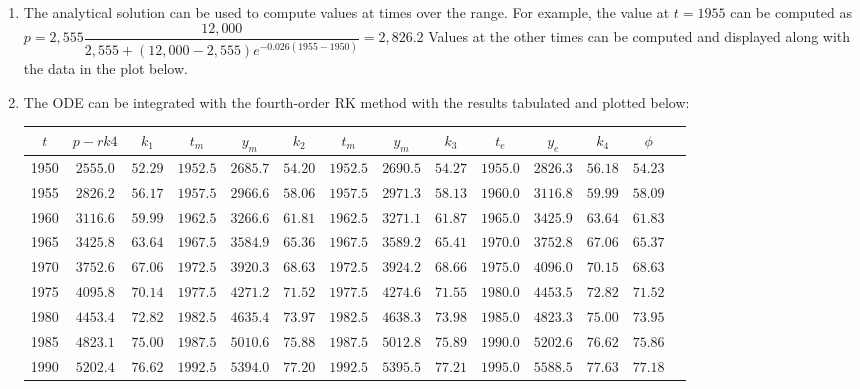 \documentclass[../main.tex]{subfiles}
\begin{document}
\section{} \label{sec:sec_18_5}
\begin{enumerate}[label=\bfseries(\alph*)]
\item  The analytical solution can be used to compute values at times over the range. For example, the value at $t=1955$ can be computed as
	\bigbreak
$p=2,555 \dfrac{12,000}{2,555+(12,000-2,555) e^{-0.026(1955-1950)}}=2,826.2$
	\bigbreak
Values at the other times can be computed and displayed along with the data in the plot below.
	\bigbreak
\item The ODE can be integrated with the fourth-order RK method with the results tabulated and plotted below:
	\bigbreak
\begin{tabular}{cccccccccccccc}
\hline
$t$ & $p-r k 4$ & $k_{1}$ & $t_{m}$ & $y_{m}$ & $k_{2}$ & $t_{m}$ & $y_{m}$ & $k_{3}$ & $t_{e}$ & $y_{e}$ & $k_{4}$ & $\phi$ \\
\hline
1950 & $2555.0$ & $52.29$ & $1952.5$ & $2685.7$ & $54.20$ & $1952.5$ & $2690.5$ & $54.27$ & $1955.0$ & $2826.3$ & $56.18$ & $54.23$ \\
1955 & $2826.2$ & $56.17$ & $1957.5$ & $2966.6$ & $58.06$ & $1957.5$ & $2971.3$ & $58.13$ & $1960.0$ & $3116.8$ & $59.99$ & $58.09$ \\
1960 & $3116.6$ & $59.99$ & $1962.5$ & $3266.6$ & $61.81$ & $1962.5$ & $3271.1$ & $61.87$ & $1965.0$ & $3425.9$ & $63.64$ & $61.83$ \\
1965 & $3425.8$ & $63.64$ & $1967.5$ & $3584.9$ & $65.36$ & $1967.5$ & $3589.2$ & $65.41$ & $1970.0$ & $3752.8$ & $67.06$ & $65.37$ \\
1970 & $3752.6$ & $67.06$ & $1972.5$ & $3920.3$ & $68.63$ & $1972.5$ & $3924.2$ & $68.66$ & $1975.0$ & $4096.0$ & $70.15$ & $68.63$ \\
1975 & $4095.8$ & $70.14$ & $1977.5$ & $4271.2$ & $71.52$ & $1977.5$ & $4274.6$ & $71.55$ & $1980.0$ & $4453.5$ & $72.82$ & $71.52$ \\
1980 & $4453.4$ & $72.82$ & $1982.5$ & $4635.4$ & $73.97$ & $1982.5$ & $4638.3$ & $73.98$ & $1985.0$ & $4823.3$ & $75.00$ & $73.95$ \\
1985 & $4823.1$ & $75.00$ & $1987.5$ & $5010.6$ & $75.88$ & $1987.5$ & $5012.8$ & $75.89$ & $1990.0$ & $5202.6$ & $76.62$ & $75.86$ \\
1990 & $5202.4$ & $76.62$ & $1992.5$ & $5394.0$ & $77.20$ & $1992.5$ & $5395.5$ & $77.21$ & $1995.0$ & $5588.5$ & $77.63$ & $77.18$ \\

\end{tabular}
\end{enumerate}
\end{document}
